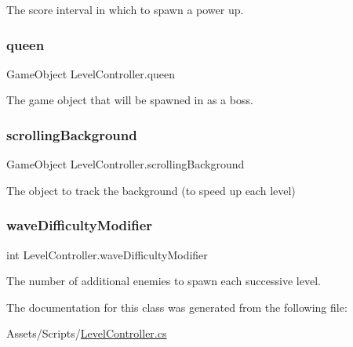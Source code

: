 The score interval in which to spawn a power up. 

\mbox{\label{class_level_controller_a42fdf92db6ac8eb813e54501476bdc21}} 
\subsubsection{\texorpdfstring{queen}{queen}}
{\footnotesize\ttfamily Game\+Object Level\+Controller.\+queen}



The game object that will be spawned in as a boss. 

\mbox{\label{class_level_controller_a09cc9c55bc33be5c9c9861f1291f2070}} 
\subsubsection{\texorpdfstring{scrollingBackground}{scrollingBackground}}
{\footnotesize\ttfamily Game\+Object Level\+Controller.\+scrolling\+Background}



The object to track the background (to speed up each level) 

\mbox{\label{class_level_controller_a7a4d99d10f9128d12efb3b10cdeee921}} 
\subsubsection{\texorpdfstring{waveDifficultyModifier}{waveDifficultyModifier}}
{\footnotesize\ttfamily int Level\+Controller.\+wave\+Difficulty\+Modifier}



The number of additional enemies to spawn each successive level. 



The documentation for this class was generated from the following file\+:\begin{DoxyCompactItemize}
\item 
Assets/\+Scripts/\mbox{\hyperlink{_level_controller_8cs}{Level\+Controller.\+cs}}\end{DoxyCompactItemize}

